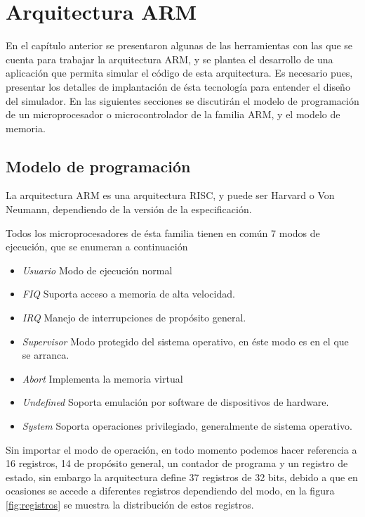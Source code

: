 \chapter{Arquitectura ARM}\label{ch:arquitectura_arm}

En el capítulo anterior se presentaron algunas de las herramientas
con las que se cuenta para trabajar la arquitectura \ac{ARM}, y se
plantea el desarrollo de una aplicación que permita simular el código
de esta arquitectura. Es necesario pues, presentar los detalles de
implantación de ésta tecnología para entender el diseño del simulador.
En las siguientes secciones se discutirán el modelo de programación
de un microprocesador o microcontrolador de la familia \ac{ARM},
y el modelo de memoria.


\section{Modelo de programaci\'on}

La arquitectura \ac{ARM} es una arquitectura \ac{RISC}, y puede
ser Harvard o Von Neumann, dependiendo de la versión de la especificación.

Todos los microprocesadores de ésta familia tienen en común 7 modos
de ejecución, que se enumeran a continuación \citep{armmanual}
\begin{itemize}
\item \emph{Usuario} Modo de ejecución normal
\item \emph{\ac{FIQ}} Suporta acceso a memoria de alta velocidad.
\item \emph{\ac{IRQ}} Manejo de interrupciones de propósito general.
\item \emph{Supervisor} Modo protegido del sistema operativo, en éste modo
es en el que se arranca.
\item \emph{Abort }Implementa la memoria virtual
\item \emph{Undefined }Soporta emulación por software de dispositivos de
hardware.
\item \emph{System} Soporta operaciones privilegiado, generalmente de sistema
operativo.
\end{itemize}
Sin importar el modo de operación, en todo momento podemos hacer referencia
a 16 registros, 14 de propósito general, un contador de programa y
un registro de estado, sin embargo la arquitectura define 37 registros
de 32 bits, debido a que en ocasiones se accede a diferentes registros
dependiendo del modo, en la figura \ref{fig:registros} se muestra
la distribución de estos registros.


